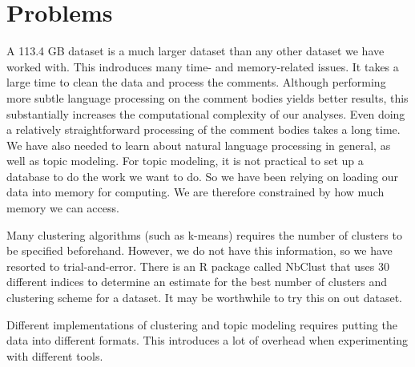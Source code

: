 \documentclass[letterpaper]{article}
\numberwithin{equation}{subsection}
\begin{document}
\section{Problems}
A 113.4 GB dataset is a much larger dataset than any other dataset we have worked with. This indroduces many time- and memory-related issues. It takes a large time to clean the data and process the comments. Although performing more subtle language processing on the comment bodies yields better results, this substantially increases the computational complexity of our analyses. Even doing a relatively straightforward processing of the comment bodies takes a long time. We have also needed to learn about natural language processing in general, as well as topic modeling. For topic modeling, it is not practical to set up a database to do the work we want to do. So we have been relying on loading our data into memory for computing. We are therefore constrained by how much memory we can access.

Many clustering algorithms (such as k-means) requires the number of clusters to be specified beforehand. However, we do not have this information, so we have resorted to trial-and-error. There is an R package called NbClust that uses 30 different indices to determine an estimate for the best number of clusters and clustering scheme for a dataset. It may be worthwhile to try this on out dataset.

Different implementations of clustering and topic modeling requires putting the data into different formats. This introduces a lot of overhead when experimenting with different tools.
\end{document}
